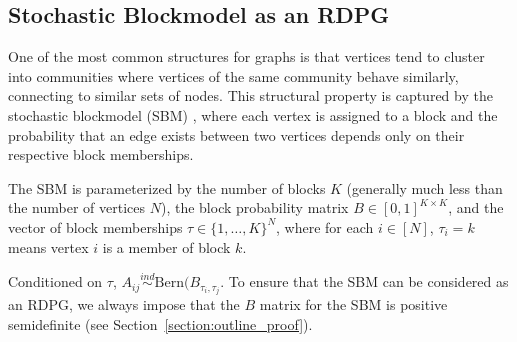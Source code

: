 \documentclass[journal,twoside,web]{ieeecolor}
\newtheorem{remark}[fact]{Remark}
\begin{document}
\subsection{Stochastic Blockmodel as an RDPG}
\label{section:sbm_rdpg}
One of the most common structures for graphs is that vertices tend to cluster into communities where vertices of the same community behave similarly, connecting to similar sets of nodes.
This structural property is captured by the stochastic blockmodel (SBM) \cite{holland1983stochastic}, where each vertex is assigned to a block and the probability that an edge exists between two vertices depends only on their respective block memberships.



The SBM is parameterized by the number of blocks $K$ (generally much less than the number of vertices $N$), the block probability matrix $B \in [0,1]^{K \times K}$, and the vector of block memberships
$\tau\in\{1,\dotsc,K\}^N$, where for each $i \in [N]$, $\tau_i = k$ means vertex $i$ is a member of block $k$.

Conditioned on $\tau$, $A_{ij} \stackrel{ind}{\sim} \mathrm{Bern}(B_{\tau_i,\tau_j}$.
To ensure that the SBM can be considered as an RDPG, we always impose that the $B$ matrix for the SBM is positive semidefinite (see Section~\ref{section:outline_proof}).



\end{document}
